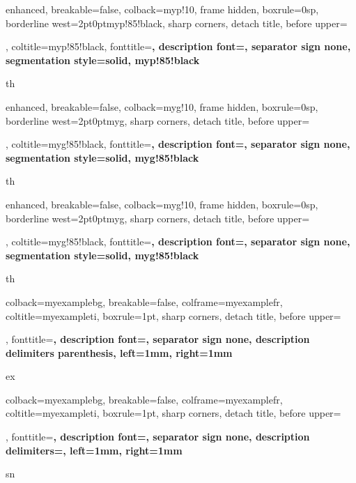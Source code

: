 {enhanced, breakable=false, colback=myp!10, frame hidden, boxrule=0sp,
  borderline west={2pt}{0pt}{myp!85!black}, sharp corners, detach title,
  before upper={\renewcommand{\familydefault}{\sfdefault}\selectfont\tcbtitle\par\smallskip},
  coltitle=myp!85!black, fonttitle=\bfseries\sffamily, description font=\mdseries,
  separator sign none, segmentation style={solid, myp!85!black}}{th}

{enhanced, breakable=false, colback=myg!10, frame hidden, boxrule=0sp,
  borderline west={2pt}{0pt}{myg}, sharp corners, detach title,
  before upper={\renewcommand{\familydefault}{\sfdefault}\selectfont\tcbtitle\par\smallskip},
  coltitle=myg!85!black, fonttitle=\bfseries\sffamily, description font=\mdseries,
  separator sign none, segmentation style={solid, myg!85!black}}{th}

{enhanced, breakable=false, colback=myg!10, frame hidden, boxrule=0sp,
  borderline west={2pt}{0pt}{myg}, sharp corners, detach title,
  before upper={\renewcommand{\familydefault}{\sfdefault}\selectfont\tcbtitle\par\smallskip},
  coltitle=myg!85!black, fonttitle=\bfseries\sffamily, description font=\mdseries,
  separator sign none, segmentation style={solid, myg!85!black}}{th}

{colback=myexamplebg, breakable=false, colframe=myexamplefr, coltitle=myexampleti,
  boxrule=1pt, sharp corners, detach title,
  before upper={\renewcommand{\familydefault}{\sfdefault}\selectfont\tcbtitle\par\smallskip},
  fonttitle=\bfseries\sffamily, description font=\mdseries,
  separator sign none, description delimiters parenthesis,
  left=1mm, %
  right=1mm %
}{ex}

{colback=myexamplebg, breakable=false, colframe=myexamplefr, coltitle=myexampleti,
  boxrule=1pt, sharp corners, detach title,
  before upper={\renewcommand{\familydefault}{\sfdefault}\selectfont\tcbtitle\par\smallskip},
  fonttitle=\bfseries\sffamily, description font=\mdseries,
  separator sign none, description delimiters={}, %
  left=1mm, %
  right=1mm %
}{sn}


